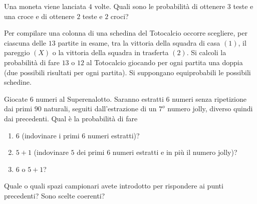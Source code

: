\Esercizio{}

Una moneta viene lanciata $4$ volte. Quali sono le probabilità di ottenere $3$ teste e una croce e di ottenere $2$ teste e $2$ croci?

\Esercizio{}

Per compilare una colonna di una schedina del Totocalcio occorre scegliere, per ciascuna delle $13$ partite in esame, tra la vittoria della squadra di casa $( 1)$, il pareggio $( X)$ o la vittoria della squadra in trasferta $( 2)$. Si calcoli la probabilità di fare $13$ o $12$ al Totocalcio giocando per ogni partita una doppia (due possibili risultati per ogni partita). Si suppongano equiprobabili le possibili schedine.

\Esercizio{}

Giocate $6$ numeri al Superenalotto. Saranno estratti $6$ numeri senza ripetizione dai primi $90$ naturali, seguiti dall'estrazione di un $7^{o}$ numero jolly, diverso quindi dai precedenti. Qual è la probabilità di fare
\begin{enumerate}
	\item $6$ (indovinare i primi $6$ numeri estratti)?
	\item $5+1$ (indovinare $5$ dei primi $6$ numeri estratti e in più il numero jolly)?
	\item $6$ o $5+1$?
\end{enumerate}

Quale o quali spazi campionari avete introdotto per rispondere ai punti precedenti? Sono scelte coerenti?

\Esercizio{}

